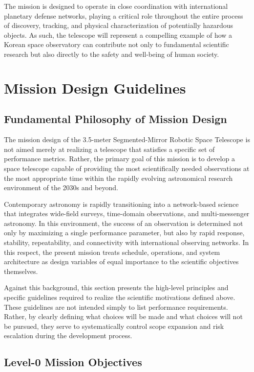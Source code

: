 The mission is designed to operate in close coordination with international planetary defense networks, playing a critical role throughout the entire process of discovery, tracking, and physical characterization of potentially hazardous objects. As such, the telescope will represent a compelling example of how a Korean space observatory can contribute not only to fundamental scientific research but also directly to the safety and well-being of human society.

\chapter{Mission Design Guidelines}

\section{Fundamental Philosophy of Mission Design}

The mission design of the 3.5-meter Segmented-Mirror Robotic Space Telescope is not aimed merely at realizing a telescope that satisfies a specific set of performance metrics. Rather, the primary goal of this mission is to develop a space telescope capable of providing the most scientifically needed observations at the most appropriate time within the rapidly evolving astronomical research environment of the 2030s and beyond.

Contemporary astronomy is rapidly transitioning into a network-based science that integrates wide-field surveys, time-domain observations, and multi-messenger astronomy. In this environment, the success of an observation is determined not only by maximizing a single performance parameter, but also by rapid response, stability, repeatability, and connectivity with international observing networks. In this respect, the present mission treats schedule, operations, and system architecture as design variables of equal importance to the scientific objectives themselves.

Against this background, this section presents the high-level principles and specific guidelines required to realize the scientific motivations defined above. These guidelines are not intended simply to list performance requirements. Rather, by clearly defining what choices will be made and what choices will not be pursued, they serve to systematically control scope expansion and risk escalation during the development process.

\section{Level-0 Mission Objectives}

